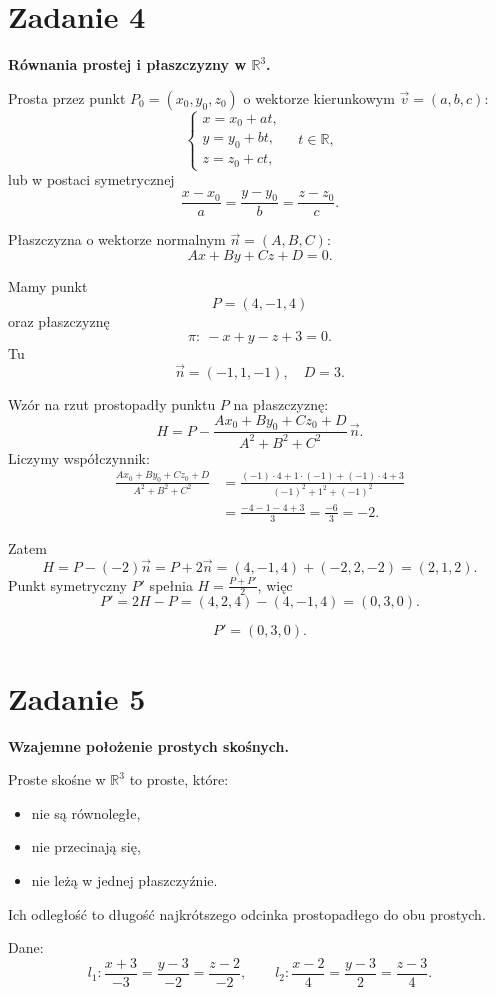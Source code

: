 \documentclass[12pt,a4paper]{article}
\begin{document}
\section*{Zadanie 4}
\textbf{Równania prostej i płaszczyzny w $\mathbb R^3$.}

Prosta przez punkt $P_0=(x_0,y_0,z_0)$ o wektorze kierunkowym $\vec v=(a,b,c)$:
\[
\begin{cases}
x=x_0+at,\\
y=y_0+bt,\\
z=z_0+ct,
\end{cases}
\quad t\in\mathbb R,
\]
lub w postaci symetrycznej
\[
\frac{x-x_0}{a}=\frac{y-y_0}{b}=\frac{z-z_0}{c}.
\]

Płaszczyzna o wektorze normalnym $\vec n=(A,B,C)$:
\[
Ax+By+Cz+D=0.
\]

Mamy punkt
\[
P=(4,-1,4)
\]
oraz płaszczyznę
\[
\pi:\ -x+y-z+3=0.
\]
Tu
\[
\vec n=(-1,1,-1),\quad D=3.
\]

Wzór na rzut prostopadły punktu $P$ na płaszczyznę:
\[
H=P-\frac{Ax_0+By_0+Cz_0+D}{A^2+B^2+C^2}\,\vec n.
\]
Liczymy współczynnik:
\begin{align*}
\frac{Ax_0+By_0+Cz_0+D}{A^2+B^2+C^2}
&=\frac{(-1)\cdot4+1\cdot(-1)+(-1)\cdot4+3}{(-1)^2+1^2+(-1)^2}\\
&=\frac{-4-1-4+3}{3}=\frac{-6}{3}=-2.
\end{align*}

Zatem
\[
H=P-(-2)\vec n=P+2\vec n=(4,-1,4)+(-2,2,-2)=(2,1,2).
\]
Punkt symetryczny $P'$ spełnia $H=\frac{P+P'}2$, więc
\[
P'=2H-P=(4,2,4)-(4,-1,4)=(0,3,0).
\]

\[
\boxed{P'=(0,3,0).}
\]

\section*{Zadanie 5}
\textbf{Wzajemne położenie prostych skośnych.}

Proste skośne w $\mathbb R^3$ to proste, które:
\begin{itemize}
\item nie są równoległe,
\item nie przecinają się,
\item nie leżą w jednej płaszczyźnie.
\end{itemize}
Ich odległość to długość najkrótszego odcinka prostopadłego do obu prostych.

Dane:
\[
l_1:\frac{x+3}{-3}=\frac{y-3}{-2}=\frac{z-2}{-2},
\qquad
l_2:\frac{x-2}{4}=\frac{y-3}{2}=\frac{z-3}{4}.
\]
\end{document}
